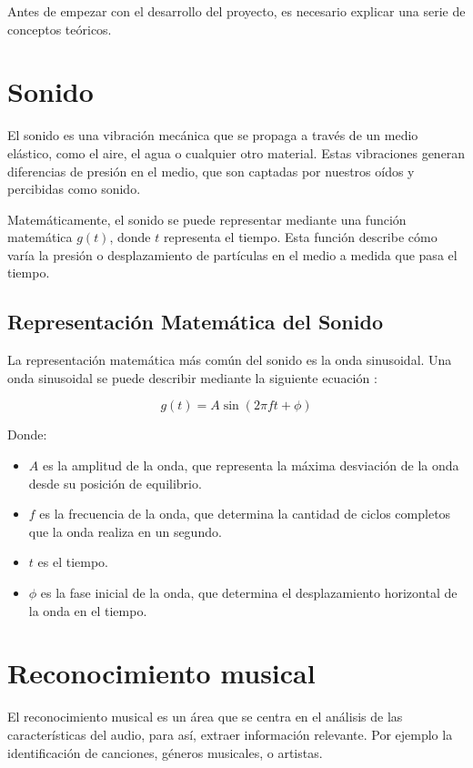 
Antes de empezar con el desarrollo del proyecto, es necesario explicar una serie de conceptos teóricos.

\section{Sonido}

El sonido es una vibración mecánica que se propaga a través de un medio elástico, como el aire, el agua o cualquier otro material. Estas vibraciones generan diferencias de presión en el medio, que son captadas por nuestros oídos y percibidas como sonido.

Matemáticamente, el sonido se puede representar mediante una función matemática $g(t)$, donde $t$ representa el tiempo. Esta función describe cómo varía la presión o desplazamiento de partículas en el medio a medida que pasa el tiempo.

\subsection{Representación Matemática del Sonido}

La representación matemática más común del sonido es la onda sinusoidal. Una onda sinusoidal se puede describir mediante la siguiente ecuación \cite{Benson_2007}:

\begin{equation}
g(t) = A \sin(2\pi ft + \phi)
\end{equation}

Donde:
\begin{itemize}
\item $A$ es la amplitud de la onda, que representa la máxima desviación de la onda desde su posición de equilibrio.
\item $f$ es la frecuencia de la onda, que determina la cantidad de ciclos completos que la onda realiza en un segundo.
\item $t$ es el tiempo.
\item $\phi$ es la fase inicial de la onda, que determina el desplazamiento horizontal de la onda en el tiempo.
\end{itemize}

\section{Reconocimiento musical}

El reconocimiento musical es un área que se centra en el análisis de las características del audio, para así, extraer información relevante. Por ejemplo la identificación de canciones, géneros musicales, o artistas.

